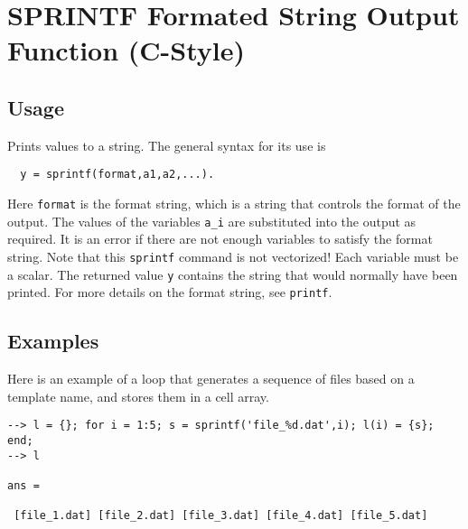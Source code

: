 \section{SPRINTF Formated String Output Function (C-Style)}

\subsection{Usage}

Prints values to a string.  The general syntax for its use is
\begin{verbatim}
  y = sprintf(format,a1,a2,...).
\end{verbatim}
Here \verb|format| is the format string, which is a string that
controls the format of the output.  The values of the variables
\verb|a_i| are substituted into the output as required.  It is
an error if there are not enough variables to satisfy the format
string.  Note that this \verb|sprintf| command is not vectorized!  Each
variable must be a scalar.  The returned value \verb|y| contains the
string that would normally have been printed. For
more details on the format string, see \verb|printf|.  
\subsection{Examples}

Here is an example of a loop that generates a sequence of files based on
a template name, and stores them in a cell array.
\begin{verbatim}
--> l = {}; for i = 1:5; s = sprintf('file_%d.dat',i); l(i) = {s}; end;
--> l

ans = 

 [file_1.dat] [file_2.dat] [file_3.dat] [file_4.dat] [file_5.dat] 
\end{verbatim}
